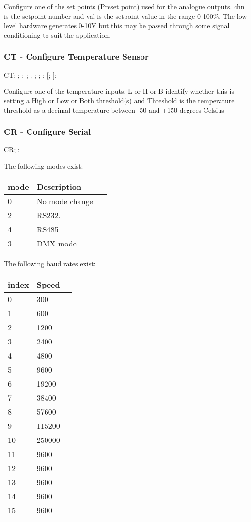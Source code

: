 Configure one of the set points (Preset point) used for the analogue outputs.
chn is the setpoint number and val is the setpoint value in the range 0-100\%. The low level hardware 
generates 0-10V but this may be passed through some signal conditioning to suit the application.

\subsubsection{CT - Configure Temperature Sensor}
CT; ; ; ; ; ; ; ; [; ];

Configure one of the temperature inputs.
L or H or B identify whether this is setting a High or Low or Both threshold(s) and Threshold is the temperature threshold
as a decimal temperature between -50 and +150 degrees Celsius

\subsubsection{CR - Configure Serial}
CR; :

The following modes exist:
\begin{tabular}{l|l|p{12cm}}
mode&Description\\
\hline
0&No mode change.\\
2&RS232.\\
4&RS485\\
3&DMX mode\\
\end{tabular}

The following baud rates exist:
\begin{tabular}{l|l|p{12cm}}
index&Speed\\
\hline
0&300\\
1&600\\
2&1200\\
3&2400\\
4&4800\\
5&9600\\
6&19200\\
7&38400\\
8&57600\\
9&115200\\
10&250000\\
11&9600\\
12&9600\\
13&9600\\
14&9600\\
15&9600\\
\end{tabular}

